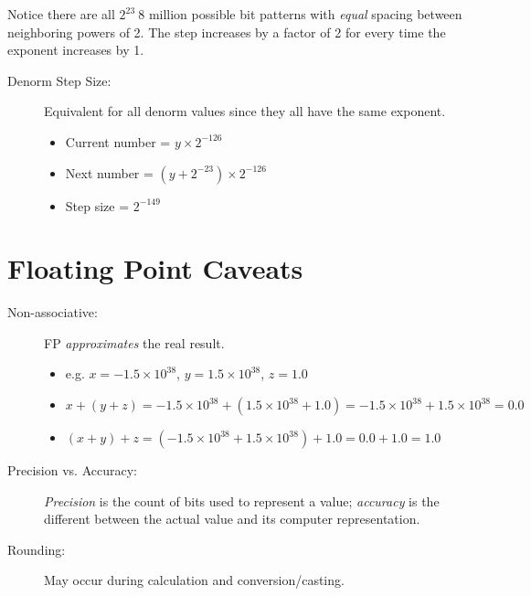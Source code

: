 Notice there are all \(2^{23} ~ 8 \text{ million}\) possible bit patterns with \emph{equal} spacing between neighboring powers of 2. The step increases by a factor of 2 for every time the exponent increases by 1.

\begin{description}
    \item[Denorm Step Size:] Equivalent for all denorm values since they all have the same exponent.
    \begin{itemize}
        \item Current number = \(y \times 2^{-126}\)
        \item Next number = \((y + 2^{-23}) \times 2^{-126}\)
        \item Step size = \(2^{-149}\)
    \end{itemize}
\end{description}

\section{Floating Point Caveats}
\begin{description}
    \item[Non-associative:] FP \emph{approximates} the real result.
    \begin{itemize}
        \item e.g. \(x = -1.5 \times 10^{38}\), \(y = 1.5 \times 10^{38}\), \(z = 1.0\)
        \item \(x + (y + z) = -1.5 \times 10^{38} + (1.5 \times 10^{38} + 1.0) = -1.5 \times 10^{38} + 1.5 \times 10^{38} = 0.0\)
        \item \((x + y) + z = (-1.5 \times 10^{38} + 1.5 \times 10^{38}) + 1.0 = 0.0 + 1.0 = 1.0\)
    \end{itemize}
    
    \item[Precision vs. Accuracy:] \emph{Precision} is the count of bits used to represent a value; \emph{accuracy} is the different between the actual value and its computer representation.
    
    \item[Rounding:] May occur during calculation and conversion/casting.
\end{description}